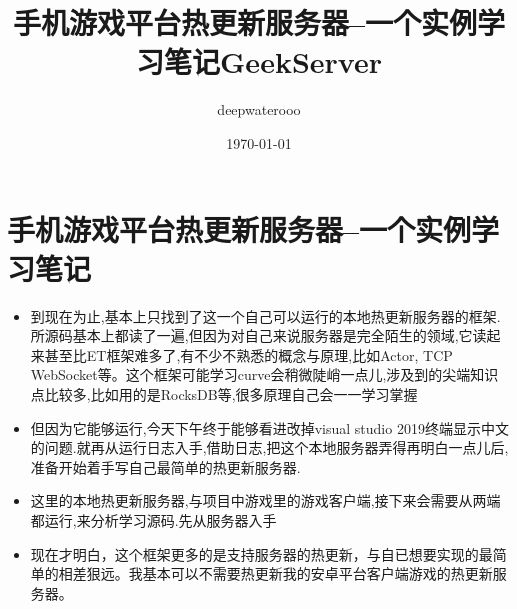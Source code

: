 \documentclass[9pt, b5paper]{article}
\author{deepwaterooo}
\date{\today}
\title{手机游戏平台热更新服务器--一个实例学习笔记GeekServer}
\begin{document}
\maketitle
\tableofcontents


\section{手机游戏平台热更新服务器--一个实例学习笔记}
\label{sec-1}
\begin{itemize}
\item 到现在为止,基本上只找到了这一个自己可以运行的本地热更新服务器的框架.所源码基本上都读了一遍,但因为对自己来说服务器是完全陌生的领域,它读起来甚至比ET框架难多了,有不少不熟悉的概念与原理,比如Actor, TCP　WebSocket等。这个框架可能学习curve会稍微陡峭一点儿,涉及到的尖端知识点比较多,比如用的是RocksDB等,很多原理自己会一一学习掌握
\item 但因为它能够运行,今天下午终于能够看进改掉visual studio 2019终端显示中文的问题.就再从运行日志入手,借助日志,把这个本地服务器弄得再明白一点儿后,准备开始着手写自己最简单的热更新服务器.
\item 这里的本地热更新服务器,与项目中游戏里的游戏客户端,接下来会需要从两端都运行,来分析学习源码.先从服务器入手
\item 现在才明白，这个框架更多的是支持服务器的热更新，与自已想要实现的最简单的相差狠远。我基本可以不需要热更新我的安卓平台客户端游戏的热更新服务器。
\end{itemize}
\end{document}
